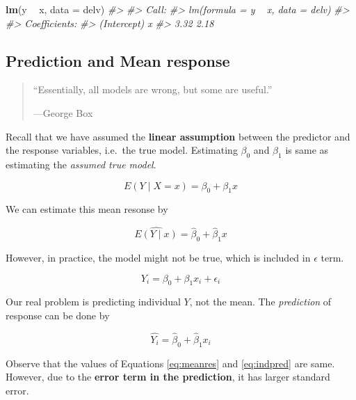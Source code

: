\documentclass[]{book}
\newenvironment{Shaded}{\begin{snugshade}}{\end{snugshade}}
\newcommand{\CommentTok}[1]{\textcolor[rgb]{0.56,0.35,0.01}{\textit{#1}}}
\newcommand{\DataTypeTok}[1]{\textcolor[rgb]{0.13,0.29,0.53}{#1}}
\newcommand{\KeywordTok}[1]{\textcolor[rgb]{0.13,0.29,0.53}{\textbf{#1}}}
\newcommand{\NormalTok}[1]{#1}
\newcommand{\OperatorTok}[1]{\textcolor[rgb]{0.81,0.36,0.00}{\textbf{#1}}}
\newcommand{\StringTok}[1]{\textcolor[rgb]{0.31,0.60,0.02}{#1}}
\theoremstyle{definition}
\theoremstyle{definition}
\theoremstyle{definition}
\theoremstyle{remark}
\let\BeginKnitrBlock\begin \let\EndKnitrBlock\end
\begin{document}
\begin{Shaded}
\begin{Highlighting}[]
\KeywordTok{lm}\NormalTok{(y }\OperatorTok{~}\StringTok{ }\NormalTok{x, }\DataTypeTok{data =}\NormalTok{ delv)}
\CommentTok{#> }
\CommentTok{#> Call:}
\CommentTok{#> lm(formula = y ~ x, data = delv)}
\CommentTok{#> }
\CommentTok{#> Coefficients:}
\CommentTok{#> (Intercept)            x  }
\CommentTok{#>        3.32         2.18}
\end{Highlighting}
\end{Shaded}

\hypertarget{prediction-and-mean-response}{%
\subsection{Prediction and Mean response}\label{prediction-and-mean-response}}

\begin{quote}
``Essentially, all models are wrong, but some are useful.''

---George Box
\end{quote}

Recall that we have assumed the \textbf{linear assumption} between the predictor and the response variables, i.e.~the true model. Estimating \(\beta_0\) and \(\beta_1\) is same as estimating the \emph{assumed true model}.

\BeginKnitrBlock{definition}[Mean response]
\protect\hypertarget{def:eyx}{}{\label{def:eyx} {} }\[E(Y \mid X = x) = \beta_0 + \beta_1 x\]
\EndKnitrBlock{definition}

We can estimate this mean resonse by

\begin{equation}
  \widehat{E(Y \mid x)} = \hat\beta_0 + \hat\beta_1 x
  \label{eq:meanres}
\end{equation}

However, in practice, the model might not be true, which is included in \(\epsilon\) term.

\[Y_i = \beta_0 + \beta_1 x_i + \epsilon_i\]

Our real problem is predicting individual \(Y\), not the mean. The \emph{prediction} of response can be done by

\begin{equation}
  \hat{Y_i}  = \hat\beta_0 + \hat\beta_1 x_i
  \label{eq:indpred}
\end{equation}

Observe that the values of Equations \eqref{eq:meanres} and \eqref{eq:indpred} are same. However, due to the \textbf{error term in the prediction}, it has larger standard error.
\end{document}
